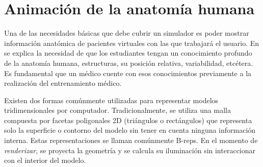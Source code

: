 \section{Animación de la anatomía humana} 
\label{art:anatomy}



Una de las necesidades básicas que debe cubrir un simulador es poder mostrar información anatómica de pacientes virtuales con las que trabajará el usuario. En  \cite{preim2018survey} se explica la necesidad de que los estudiantes tengan un conocimiento profundo de la anatomía humana, estructuras, su posición relativa, variabilidad, etcétera. Es fundamental que un médico cuente con esos conocimientos previamente a la realización del entrenamiento médico.

Existen dos formas comúnmente utilizadas para representar modelos tridimensionales por computador. Tradicionalmente, se utiliza una malla compuesta por facetas poligonales 2D (triángulos o rectángulos) que representa solo la superficie o contorno del modelo sin tener en cuenta ninguna información interna. Estas representaciones se llaman comúnmente \acp{B-rep}. En el momento de \emph{renderizar}, se proyecta la geometría y se calcula su iluminación sin interaccionar con el interior del modelo.

